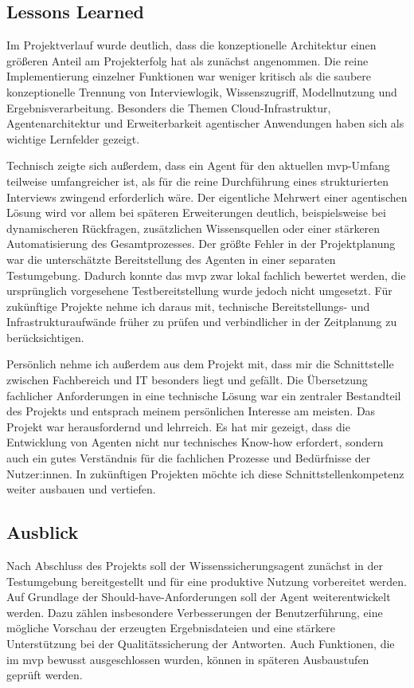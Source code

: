 \documentclass[
  10pt,
  ngerman,
  a4paper,
  toc=graduated,
  numbers=noenddot,
  headings=standardclasses,
  nonumberlist
]{scrartcl}
\begin{document}
\subsection{Lessons Learned}
\label{lessons_learned}

Im Projektverlauf wurde deutlich, dass die konzeptionelle Architektur einen größeren Anteil am Projekterfolg hat als zunächst angenommen. Die reine Implementierung einzelner Funktionen war weniger kritisch als die saubere konzeptionelle Trennung von Interviewlogik, Wissenszugriff, Modellnutzung und Ergebnisverarbeitung. Besonders die Themen Cloud-Infrastruktur, Agentenarchitektur und Erweiterbarkeit agentischer Anwendungen haben sich als wichtige Lernfelder gezeigt.

Technisch zeigte sich außerdem, dass ein Agent für den aktuellen \gls{mvp}-Umfang teilweise umfangreicher ist, als für die reine Durchführung eines strukturierten Interviews zwingend erforderlich wäre. Der eigentliche Mehrwert einer agentischen Lösung wird vor allem bei späteren Erweiterungen deutlich, beispielsweise bei dynamischeren Rückfragen, zusätzlichen Wissensquellen oder einer stärkeren Automatisierung des Gesamtprozesses.
Der größte Fehler in der Projektplanung war die unterschätzte Bereitstellung des Agenten in einer separaten Testumgebung. Dadurch konnte das \gls{mvp} zwar lokal fachlich bewertet werden, die ursprünglich vorgesehene Testbereitstellung wurde jedoch nicht umgesetzt. Für zukünftige Projekte nehme ich daraus mit, technische Bereitstellungs- und Infrastrukturaufwände früher zu prüfen und verbindlicher in der Zeitplanung zu berücksichtigen.

Persönlich nehme ich außerdem aus dem Projekt mit, dass mir die Schnittstelle zwischen Fachbereich und IT besonders liegt und gefällt. Die Übersetzung fachlicher Anforderungen in eine technische Lösung war ein zentraler Bestandteil des Projekts und entsprach meinem persönlichen Interesse am meisten. Das Projekt war herausfordernd und lehrreich. Es hat mir gezeigt, dass die Entwicklung von Agenten nicht nur technisches Know-how erfordert, sondern auch ein gutes Verständnis für die fachlichen Prozesse und Bedürfnisse der Nutzer:innen. In zukünftigen Projekten möchte ich diese Schnittstellenkompetenz weiter ausbauen und vertiefen.

\subsection{Ausblick}
\label{ausblick}
Nach Abschluss des Projekts soll der Wissenssicherungsagent zunächst in der Testumgebung bereitgestellt und für eine produktive Nutzung vorbereitet werden. Auf Grundlage der Should-have-Anforderungen soll der Agent weiterentwickelt werden. Dazu zählen insbesondere Verbesserungen der Benutzerführung, eine mögliche Vorschau der erzeugten Ergebnisdateien und eine stärkere Unterstützung bei der Qualitätssicherung der Antworten. Auch Funktionen, die im \gls{mvp} bewusst ausgeschlossen wurden, können in späteren Ausbaustufen geprüft werden.
\end{document}
